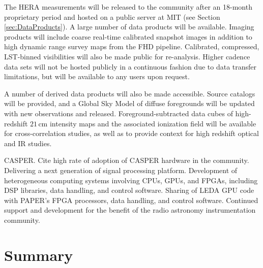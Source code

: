 \documentclass[preprint]{aastex}
\begin{document}
The HERA measurements will be released to the community after an 18-month proprietary period and hosted on a public server at MIT (see Section \ref{sec:DataProducts}).  A large number of data products will be available.  Imaging products will include coarse real-time calibrated snapshot images in addition to high dynamic range survey maps from the FHD pipeline.  Calibrated, compressed, LST-binned visibilities will also be made public for re-analysis.  Higher cadence data sets will not be hosted publicly in a continuous fashion due to data transfer limitations, but will be available to any users upon request.

A number of derived data products will also be made accessible.  Source catalogs will be provided, and a Global Sky Model of diffuse foregrounds will be updated with new observations and released.  Foreground-subtracted data cubes of high-redshift $21\,\textrm{cm}$ intensity maps and the associated ionization field will be available for cross-correlation studies, as well as to provide context for high redshift optical and IR studies.

 
CASPER.
Cite high rate of adoption of CASPER hardware in the community.
Delivering a next generation of signal processing platform.
Development of heterogeneous computing systems involving CPUs, GPUs, and FPGAs, including DSP libraries, data handling, and control software.
Sharing of LEDA GPU code \citep{clark_et_al2011} with PAPER's FPGA processors, data handling, and control software.
Continued support and development for the benefit of the radio astronomy instrumentation community.




\section{Summary} %
\end{document}
